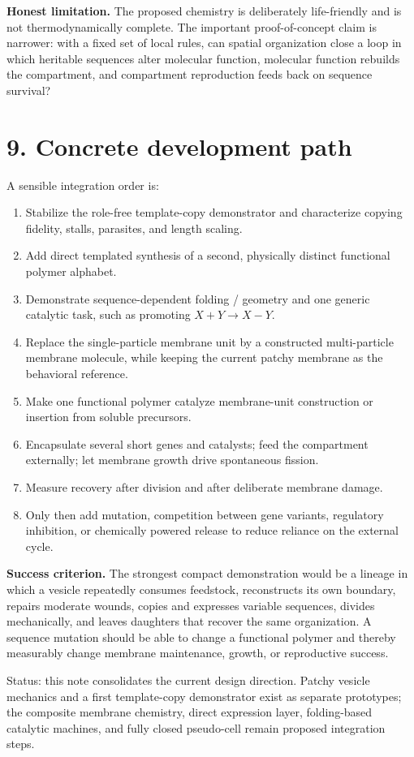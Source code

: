 \documentclass[10pt,a4paper]{article}
\begin{document}
\begin{warningbox}
\textbf{Honest limitation.} The proposed chemistry is deliberately life-friendly and is not thermodynamically complete. The important proof-of-concept claim is narrower: with a fixed set of local rules, can spatial organization close a loop in which heritable sequences alter molecular function, molecular function rebuilds the compartment, and compartment reproduction feeds back on sequence survival?
\end{warningbox}

\section{9. Concrete development path}

A sensible integration order is:

\begin{enumerate}
\item Stabilize the role-free template-copy demonstrator and characterize copying fidelity, stalls, parasites, and length scaling.
\item Add direct templated synthesis of a second, physically distinct functional polymer alphabet.
\item Demonstrate sequence-dependent folding / geometry and one generic catalytic task, such as promoting $X+Y\rightarrow X{-}Y$.
\item Replace the single-particle membrane unit by a constructed multi-particle membrane molecule, while keeping the current patchy membrane as the behavioral reference.
\item Make one functional polymer catalyze membrane-unit construction or insertion from soluble precursors.
\item Encapsulate several short genes and catalysts; feed the compartment externally; let membrane growth drive spontaneous fission.
\item Measure recovery after division and after deliberate membrane damage.
\item Only then add mutation, competition between gene variants, regulatory inhibition, or chemically powered release to reduce reliance on the external cycle.
\end{enumerate}

\begin{principle}
\textbf{Success criterion.} The strongest compact demonstration would be a lineage in which a vesicle repeatedly consumes feedstock, reconstructs its own boundary, repairs moderate wounds, copies and expresses variable sequences, divides mechanically, and leaves daughters that recover the same organization. A sequence mutation should be able to change a functional polymer and thereby measurably change membrane maintenance, growth, or reproductive success.
\end{principle}

\vfill
{\footnotesize\color{muted}
Status: this note consolidates the current design direction. Patchy vesicle mechanics and a first template-copy demonstrator exist as separate prototypes; the composite membrane chemistry, direct expression layer, folding-based catalytic machines, and fully closed pseudo-cell remain proposed integration steps.}
\end{document}
